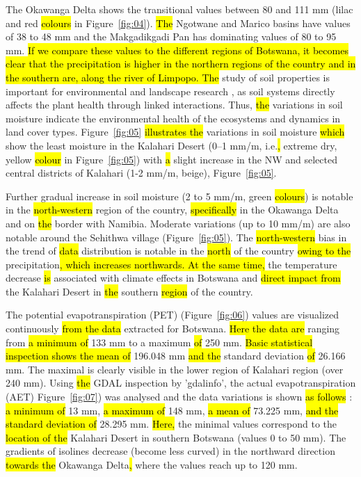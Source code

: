 \documentclass[ijgi,article,submit,pdftex,moreauthors]{Definitions/mdpi}
\begin{document}
The Okawanga Delta shows the transitional values between 80 and 111 mm (lilac and red \hl{colours} in Figure~\ref{fig:04}). \hl{The }Ngotwane and Marico basins have values of 38 to 48 mm and the Makgadikgadi Pan has dominating values of 80 to 95 mm. \hl{If we compare these values to the different regions of Botswana, it becomes clear that the precipitation is higher in the northern regions of the country and in the southern are, along the river of Limpopo. The} study of soil properties is important for environmental and landscape research \cite{Totolo,Lindh202210,Mosweu,Lemenkov202103,Zeilhofer}, as soil systems directly affects the plant health through linked interactions. Thus, \hl{the} variations in soil moisture indicate the environmental health of the ecosystems and dynamics in land cover types. Figure~\ref{fig:05} \hl{illustrates the }variations in soil moisture\hl{ which }show the least moisture in the Kalahari Desert (0–1 mm/m, i.e.\hl{, }extreme dry, yellow \hl{colour} in Figure~\ref{fig:05}) with \hl{a} slight increase in the NW and selected central districts of Kalahari (1-2 mm/m, beige), Figure~\ref{fig:05}. 

Further gradual increase in soil moisture (2 to 5 mm/m, green \hl{colours}) is notable in the \hl{north-western} region of the country, \hl{specifically} in the Okawanga Delta and on \hl{the} border with Namibia. Moderate variations (up to 10 mm/m) are also notable around the Sehithwa village (Figure~\ref{fig:05}). The \hl{north-western} bias in the trend of  \hl{data }distribution is notable in the \hl{north} of the country \hl{owing to the} precipitation\hl{, which increases northwards. At the same time,} the temperature decrease\hl{ is} associated with climate effects in Botswana and \hl{direct impact from} the Kalahari Desert in \hl{the} southern \hl{region }of the country. 

The potential evapotranspiration (PET) (Figure~\ref{fig:06}) values are visualized continuously \hl{from the data} extracted for Botswana. \hl{Here the data are} ranging from \hl{a minimum of} 133 mm to a maximum \hl{of} 250 mm. \hl{Basic statistical inspection shows the mean of} 196.048 mm \hl{and the} standard deviation \hl{of} 26.166 mm. The maximal is clearly visible in the lower region of Kalahari region (over 240 mm). Using \hl{the} GDAL inspection by 'gdalinfo', the actual evapotranspiration (AET) Figure~\ref{fig:07}) was analysed and the data variations is shown \hl{as follows} : \hl{a minimum of} 13 mm, \hl{a maximum of} 148 mm, \hl{a mean of} 73.225 mm, \hl{and the standard deviation of} 28.295 mm. \hl{Here,} the minimal values correspond to the \hl{location of the} Kalahari Desert\hl{ }in southern Botswana (values 0 to 50 mm). The gradients of isolines decrease (become less curved) in the northward direction \hl{towards the} Okawanga Delta\hl{, }where the values reach up to 120 mm.
\end{document}
